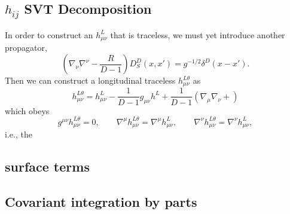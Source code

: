 \documentclass[10pt,letterpaper]{article}
\begin{document}
\subsection{$h_{ij}$ SVT Decomposition}
In order to construct an $h^L_{\mu\nu}$ that is traceless, we must yet introduce another propagator,
\begin{equation}
\left(\nabla_\nu \nabla^\nu - \frac{R}{D-1}\right)D^D_S(x,x') = g^{-1/2}\delta^D(x-x').
\end{equation}
Then we can construct a longitudinal traceless $h^{L\theta}_{\mu\nu}$ as
\begin{equation}
h_{\mu\nu}^{L\theta} = h_{\mu\nu}^L - \frac{1}{D-1}g_{\mu\nu} h^L + \frac{1}{D-1}\left( \nabla_\mu\nabla_\nu + \right)
\end{equation}
which obeys
\begin{equation}
g^{\mu\nu}h^{L\theta}_{\mu\nu} = 0,\qquad \nabla^\mu h^{L\theta}_{\mu\nu}= \nabla^\mu h^{L}_{\mu\nu},
\qquad \nabla^\nu h^{L\theta}_{\mu\nu}= \nabla^\nu h^{L}_{\mu\nu},
\end{equation}
i.e., the 
\subsection{surface terms}
\subsection{Covariant integration by parts}
\end{document}
